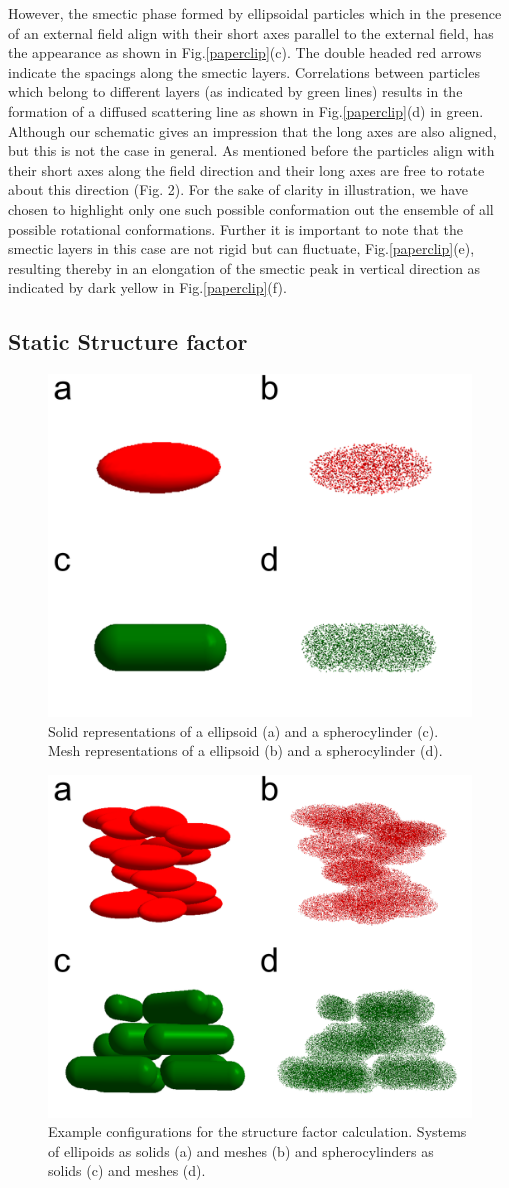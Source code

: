 \documentclass[aip,graphicx]{revtex4-1} %
\begin{document}
However, the smectic phase formed by ellipsoidal particles which in the presence of an external field align with their short axes parallel to the external
field, has the appearance as shown in Fig.\ref{paperclip}(c). The double headed red arrows indicate the spacings along the smectic layers. Correlations between
particles which belong to different layers (as indicated by green lines) results in the formation of a diffused scattering line as shown in
Fig.\ref{paperclip}(d) in green. Although our schematic gives an impression that the long axes are also aligned, but this is not the case in general. As
mentioned before the particles align with their short axes along the field direction and their long axes are free to rotate about this direction (Fig. 2). For
the sake of clarity in illustration, we have chosen to
highlight only one such possible conformation out the ensemble of all possible rotational conformations. Further it is important to note that the smectic layers
in this case are not rigid but can fluctuate, Fig.\ref{paperclip}(e), resulting thereby in an elongation of the smectic peak in vertical direction as indicated
by dark yellow in Fig.\ref{paperclip}(f).


\subsection{Static Structure factor}

\begin{figure}
    \centering
    \includegraphics[width=0.4\columnwidth]{Scatteringmodel_single.png}
    \caption{Solid representations of a ellipsoid (a) and a spherocylinder (c). Mesh representations of a ellipsoid (b) and a spherocylinder (d).}\label{fig:scatt_mod_single}
\end{figure}

\begin{figure}
    \centering
    \includegraphics[width=0.4\columnwidth]{Scatteringmodel1.png}
    \caption{Example configurations for the structure factor calculation. Systems of ellipoids as solids (a) and meshes (b) and spherocylinders as solids (c) and meshes (d).}\label{fig:scatt_mod1}
\end{figure}
\end{document}
